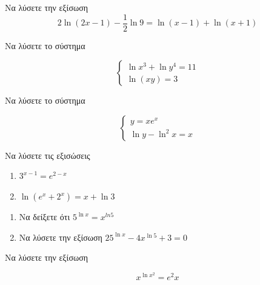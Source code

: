 \documentclass{presentation}
\begin{document}
\begin{askisi}
  Να λύσετε την εξίσωση
  $$2\ln (2x-1)-\dfrac{1}{2}\ln 9=\ln (x-1)+\ln (x+1)$$


\end{askisi}

\begin{askisi}
  Να λύσετε το σύστημα

  $$\begin{cases}
      \ln x^3+\ln y^4=11 \\
      \ln (xy)=3
    \end{cases}$$


\end{askisi}

\begin{askisi}
  Να λύσετε το σύστημα

  $$\begin{cases}
      y=xe^x \\
      \ln y-\ln^2x=x
    \end{cases}$$


\end{askisi}

\begin{askisi}
  Να λύσετε τις εξισώσεις
  \begin{enumerate}
    \item<1-> $3^{x-1}=e^{2-x}$
    \item<2-> $\ln (e^x+2^x)=x+\ln 3$
  \end{enumerate}


\end{askisi}

\begin{askisi}
  \begin{enumerate}
    \item<1-> Να δείξετε ότι $5^{\ln x}=x^{ln 5}$
    \item<2-> Να λύσετε την εξίσωση $25^{\ln x}-4x^{\ln 5}+3=0$
  \end{enumerate}


\end{askisi}

\begin{askisi}
  Να λύσετε την εξίσωση

  $$x^{\ln x^2}=e^2x$$


\end{askisi}
\end{document}
